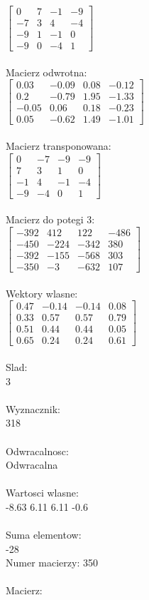 \documentclass[a4paper,12pt]{article}
\begin{document}
$\begin{bmatrix} 0&7&-1&-9\\-7&3&4&-4\\-9&1&-1&0\\-9&0&-4&1 \end{bmatrix}$
\\
\\
Macierz odwrotna:\\

$\begin{bmatrix} 0.03&-0.09&0.08&-0.12\\0.2&-0.79&1.95&-1.33\\-0.05&0.06&0.18&-0.23\\0.05&-0.62&1.49&-1.01 \end{bmatrix}$
\\
\\
Macierz transponowana:\\

$\begin{bmatrix} 0&-7&-9&-9\\7&3&1&0\\-1&4&-1&-4\\-9&-4&0&1 \end{bmatrix}$
\\
\\
Macierz do potegi 3:\\

$\begin{bmatrix} -392&412&122&-486\\-450&-224&-342&380\\-392&-155&-568&303\\-350&-3&-632&107 \end{bmatrix}$
\\
\\
Wektory wlasne:\\

$\begin{bmatrix} 0.47&-0.14&-0.14&0.08\\0.33&0.57&0.57&0.79\\0.51&0.44&0.44&0.05\\0.65&0.24&0.24&0.61 \end{bmatrix}$
\\
\\
Slad:\\
3
\\
\\
Wyznacznik:\\
318
\\
\\
Odwracalnosc:\\
Odwracalna
\\
\\
Wartosci wlasne:\\
-8.63 6.11 6.11 -0.6
\\
\\
Suma elementow:\\
-28
\\
\newpage
Numer macierzy:
350
\\
\\
Macierz:\\
\end{document}
